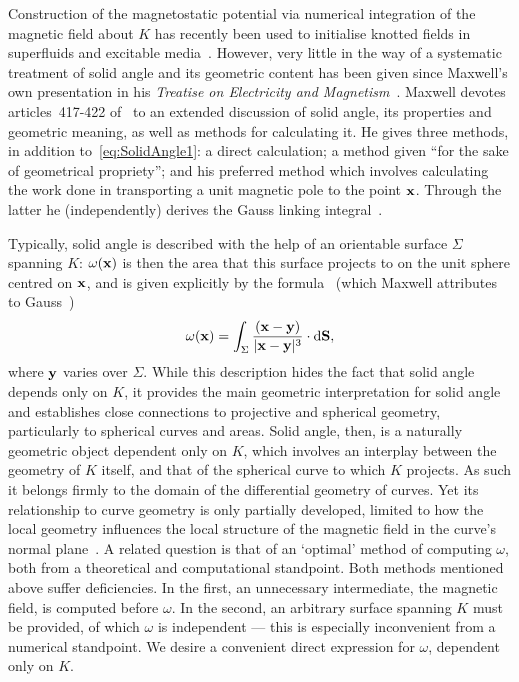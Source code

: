     Construction of the magnetostatic potential via numerical integration of the magnetic field about $K$ has recently been used to initialise knotted fields in superfluids and excitable media~\citep{Kleckner2016,Maucher2016}. However, very little in the way of a systematic treatment of solid angle and its geometric content has been given since Maxwell's own presentation in his {\sl Treatise on Electricity and Magnetism}~\citep{Maxwell2}. Maxwell devotes articles~417-422 of~\citep{Maxwell2} to an extended discussion of solid angle, its properties and geometric meaning, as well as methods for calculating it. He gives three methods, in addition to~\eqref{eq:SolidAngle1}: a direct calculation; a method given ``for the sake of geometrical propriety''; and his preferred method which involves calculating the work done in transporting a unit magnetic pole to the point ${\bf x}$. Through the latter he (independently) derives the Gauss linking integral~\citep{Ricca2011}. 

    Typically, solid angle is described with the help of an orientable surface $\Sigma$ spanning $K$: $\omega({\bf x})$ is then the area that this surface projects to on the unit sphere centred on $\bf x$, and is given explicitly by the formula~\citep{Saffman1992} (which Maxwell attributes to Gauss~\citep[Art.~409]{Maxwell2})
    \begin{equation}
        \omega({\bf x}) = \int_{\Sigma} \frac{({\bf x}-{\bf y})}{|{\bf x}-{\bf y}|^3}\cdot \mathrm{d}{\bf S} ,
        \label{eq:SolidAngle1}
    \end{equation}
    where ${\bf y}$ varies over $\Sigma$. While this description hides the fact that solid angle depends only on $K$, it provides the main geometric interpretation for solid angle and establishes close connections to projective and spherical geometry, particularly to spherical curves and areas. Solid angle, then, is a naturally geometric object dependent only on $K$, which involves an interplay between the geometry of $K$ itself, and that of the spherical curve to which $K$ projects. As such it belongs firmly to the domain of the differential geometry of curves. Yet its relationship to curve geometry is only partially developed, limited to how the local geometry influences the local structure of the magnetic field in the curve's normal plane~\citep{Saffman1992,Moore1972,Ricca1994}. A related question is that of an `optimal' method of computing $\omega$, both from a theoretical and computational standpoint. Both methods mentioned above suffer deficiencies. In the first, an unnecessary intermediate, the magnetic field, is computed before $\omega$. In the second, an arbitrary surface spanning $K$ must be provided, of which $\omega$ is independent --- this is especially inconvenient from a numerical standpoint. We desire a convenient direct expression for $\omega$, dependent only on $K$. 

